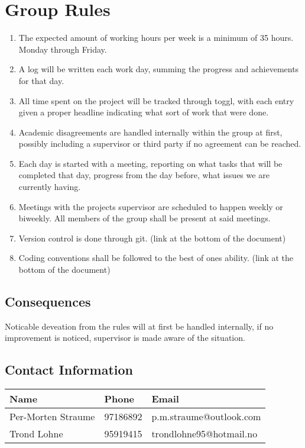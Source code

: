 \documentclass{article}
\begin{document}
\section*{Group Rules}

\begin{enumerate}
    \item 
        The expected amount of working hours per week is a minimum of 35 hours. 
        Monday through Friday. 

    \item
        A log will be written each work day, summing the progress and achievements for that day.

    \item
        All time spent on the project will be tracked through toggl, with each entry given a proper headline indicating what sort of work that were done.
    
    \item
        Academic disagreements are handled internally within the group at first, possibly including a supervisor or third party if no agreement can be reached.
    
    \item 
        Each day is started with a meeting, reporting on what tasks that will be completed that day, progress from the day before, what issues we are currently having. 
    
    \item 
        Meetings with the projects supervisor are scheduled to happen weekly or biweekly.
        All members of the group shall be present at said meetings.
    
    \item 
        Version control is done through git. (link at the bottom of the document)
             
    \item 
        Coding conventions shall be followed to the best of ones ability. (link at the bottom of the document)
\end{enumerate}

\subsection*{Consequences}
    Noticable deveation from the rules will at first be handled internally, if no improvement is noticed, supervisor is made aware of the situation.

\subsection*{Contact Information}
\begin{table}[h!]
    \begin{tabularx}{\textwidth}{XXX}
        \toprule
        Name & Phone & Email \\
        \midrule
        Per-Morten Straume & 97186892 & p.m.straume@outlook.com \\
        Trond Lohne & 95919415 & trondlohne95@hotmail.no \\
        \bottomrule
    \end{tabularx}
\end{table}
\end{document}
